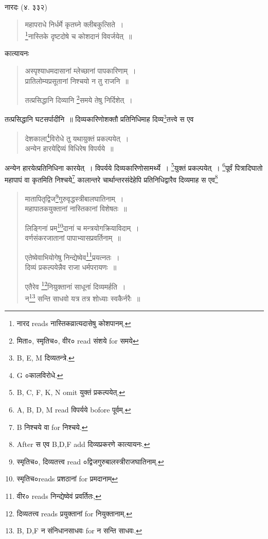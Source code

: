 \documentclass[11pt, openany]{book}
\begin{document}
नारदः (४. ३३२)

\begin{quote}
{\vy महापराधे निर्धर्मे कृतघ्ने क्लीबकुत्सिते~।\\
\renewcommand{\thefootnote}{2}\footnote{नारद reads नास्तिकव्रात्यदासेषु कोशपानम्.}नास्तिके दृष्टदोषे च कोशदानं विवर्जयेत्~॥}
\end{quote}

कात्यायनः

\begin{quote}
{\vy अस्पृश्याधमदासानां म्लेच्छानां पापकारिणाम्~।\\
प्रातिलोम्यप्रसूतानां निश्चयो न तु राजनि~॥

तत्प्रसिद्धानि दिव्यानि \renewcommand{\thefootnote}{3}\footnote{मिता०, स्मृतिच०, वीर० read संशये for समये}समये तेषु निर्दिशेत्~।}
\end{quote}

तत्प्रसिद्धानि घटसर्पादीनि~॥ दिव्यकारिणोशक्तौ प्रतिनिधिमाह दिव्य\renewcommand{\thefootnote}{4}\footnote{B, E, M दिव्यतन्त्रे.}तत्त्वे स एव

\begin{quote}
{\vy देशकाला\renewcommand{\thefootnote}{5}\footnote{G ०कालविरोधे.}विरोधे तु यथायुक्तं प्रकल्पयेत्~।\\
अन्येन हारयेद्दिव्यं विधिरेष विपर्यये~॥}
\end{quote}

अन्येन हारयेत्प्रतिनिधिना कारयेत्~। विपर्यये दिव्यकारिणोसामर्थ्ये~। \renewcommand{\thefootnote}{6}\footnote{B, C, F, K, N omit युक्तं प्रकल्पयेत्.}युक्तं प्रकल्पयेत्~। \renewcommand{\thefootnote}{7}\footnote{A, B, D, M read विपर्यये bofore पूर्वम्.}पूर्वं पित्रादिघातो महापापं वा कृतमिति निश्चये\renewcommand{\thefootnote}{8}\footnote{B निश्चये वा for निश्चये.} कालान्तरे चार्थान्तरसंदेहेपि प्रतिनिधिद्वारैव दिव्यमाह स एव\renewcommand{\thefootnote}{9}\footnote{After स एव B,D,F add दिव्यप्रकरणे कात्यायनः.}

\newpage
{}

\begin{quote}
{\vy मातापितृद्विज\renewcommand{\thefootnote}{1}\footnote{स्मृतिच०, दिव्यतत्त्व read ०द्विजगुरुबालस्त्रीराजघातिनाम्.}गुरुवृद्धस्त्रीबालघातिनाम्~।\\
महापातकयुक्तानां नास्तिकानां विशेषतः~॥

लिङ्गिनां प्रम\renewcommand{\thefootnote}{2}\footnote{स्मृतिच०reads प्रशठानां for प्रमदानाम्}दानां च मन्त्रयोगक्रियाविदाम्~।\\
वर्णसंकरजातानां पापाभ्यासप्रवर्तिनाम्~॥

एतेष्वेवाभियोगेषु निन्द्येष्वेव\renewcommand{\thefootnote}{3}\footnote{वीर० reads निन्द्येष्वेवं प्रवर्तितः,}प्रयत्नतः~।\\
दिव्यं प्रकल्पयेन्नैव राजा धर्मपरायणः~॥

एतैरेव \renewcommand{\thefootnote}{4}\footnote{दिव्यतत्त्व reads प्रयुक्तानां for नियुक्तानाम्.}नियुक्तानां साधूनां दिव्यमर्हति~।\\
न\renewcommand{\thefootnote}{5}\footnote{B, D,F न संनिधानसाधवः for न सन्ति साधवः.} सन्ति साधवो यत्र तत्र शोध्याः स्वकैर्नरैः~॥}
\end{quote}
\end{document}
